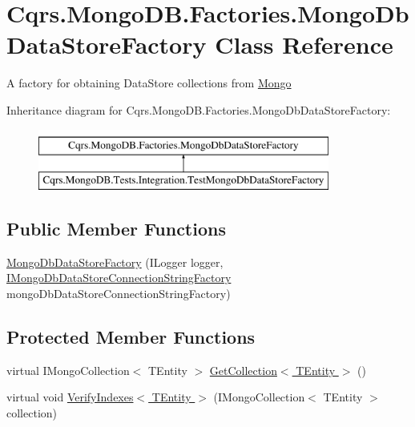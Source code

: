 \hypertarget{classCqrs_1_1MongoDB_1_1Factories_1_1MongoDbDataStoreFactory}{}\section{Cqrs.\+Mongo\+D\+B.\+Factories.\+Mongo\+Db\+Data\+Store\+Factory Class Reference}
\label{classCqrs_1_1MongoDB_1_1Factories_1_1MongoDbDataStoreFactory}


A factory for obtaining Data\+Store collections from \hyperlink{namespaceCqrs_1_1Mongo}{Mongo}  


Inheritance diagram for Cqrs.\+Mongo\+D\+B.\+Factories.\+Mongo\+Db\+Data\+Store\+Factory\+:\begin{figure}[H]
\begin{center}
\leavevmode
\includegraphics[height=2.000000cm]{classCqrs_1_1MongoDB_1_1Factories_1_1MongoDbDataStoreFactory}
\end{center}
\end{figure}
\subsection*{Public Member Functions}
\begin{DoxyCompactItemize}
\item 
\hyperlink{classCqrs_1_1MongoDB_1_1Factories_1_1MongoDbDataStoreFactory_a5306704647ba6dab35844231ca999b7e}{Mongo\+Db\+Data\+Store\+Factory} (I\+Logger logger, \hyperlink{interfaceCqrs_1_1MongoDB_1_1Factories_1_1IMongoDbDataStoreConnectionStringFactory}{I\+Mongo\+Db\+Data\+Store\+Connection\+String\+Factory} mongo\+Db\+Data\+Store\+Connection\+String\+Factory)
\end{DoxyCompactItemize}
\subsection*{Protected Member Functions}
\begin{DoxyCompactItemize}
\item 
virtual I\+Mongo\+Collection$<$ T\+Entity $>$ \hyperlink{classCqrs_1_1MongoDB_1_1Factories_1_1MongoDbDataStoreFactory_ab1b732065a4369b09851119969a4815f}{Get\+Collection$<$ T\+Entity $>$} ()
\item 
virtual void \hyperlink{classCqrs_1_1MongoDB_1_1Factories_1_1MongoDbDataStoreFactory_a1be5e7f0670e120c5105ff96d9ce9f82}{Verify\+Indexes$<$ T\+Entity $>$} (I\+Mongo\+Collection$<$ T\+Entity $>$ collection)
\end{DoxyCompactItemize}
